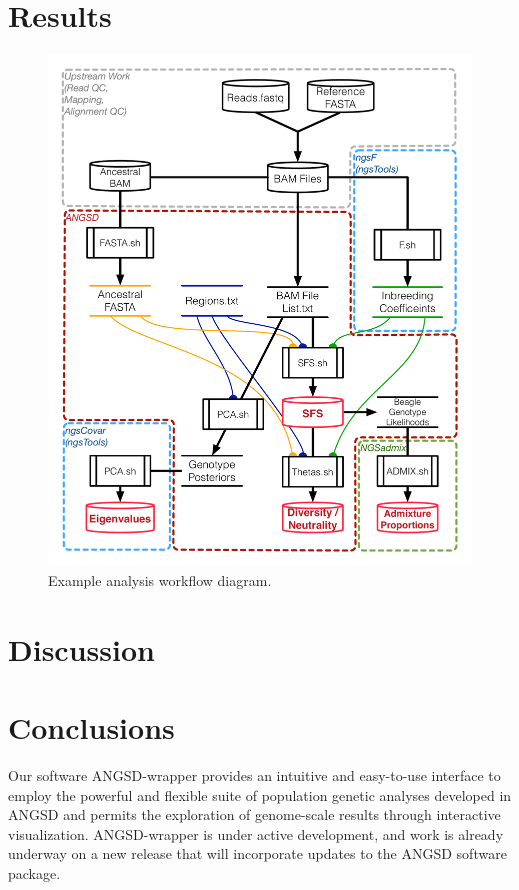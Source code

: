 \documentclass[10pt,a4paper]{article}
\begin{document}
\section*{Results}

\begin{figure}
\centering
\includegraphics[width=\linewidth]{figures/MainTextWorkflow.pdf}
\caption{Example analysis workflow diagram.}
\label{fig:workflow}
\end{figure}

\section*{Discussion}

\section*{Conclusions}
Our software ANGSD-wrapper provides an intuitive and easy-to-use interface to employ the powerful and flexible suite of population genetic analyses developed in ANGSD \citep{korneliussen2014angsd} and permits the exploration of genome-scale results through interactive visualization.
ANGSD-wrapper is under active development, and work is already underway on a new release that will incorporate updates to the ANGSD software package.  
\end{document}

